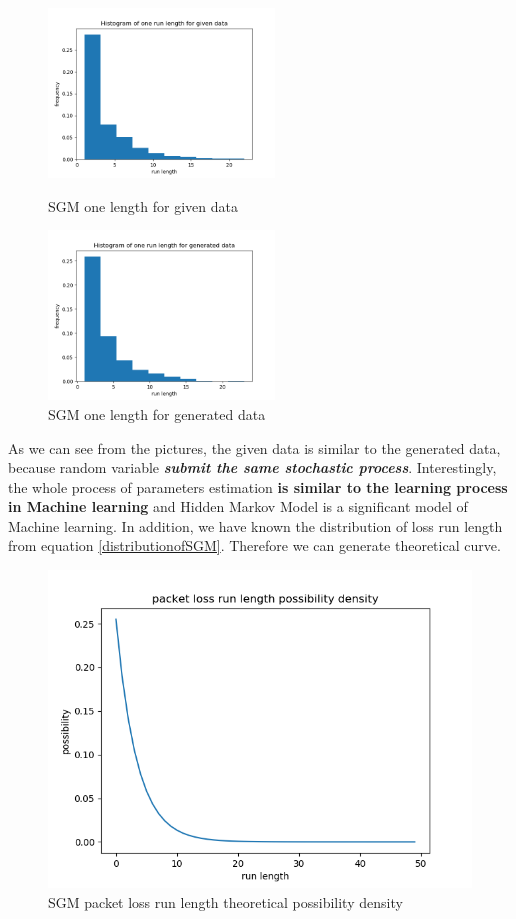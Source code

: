 \documentclass[11pt]{article}
\begin{document}
\begin{figure}[htbp]
    \centering
    \begin{minipage}[t]{0.48\textwidth}
    \centering
    \includegraphics[width=6cm]{Histogram_of_one_run_length_for_given_data.png}
    \caption{SGM one length for given data}
    \end{minipage}
    \begin{minipage}[t]{0.48\textwidth}
    \centering
    \includegraphics[width=6cm]{Histogram_of_one_run_length_for_generated_data.png}
    \caption{SGM one length for generated data}
    \end{minipage}
\end{figure}
As we can see from the pictures, the given data is similar to the generated data, because random variable \textbf{\emph{submit the same stochastic process}}. 
Interestingly, the whole process of parameters estimation \textbf{is similar to the learning process in Machine learning} and Hidden Markov Model is a significant model of Machine learning.
In addition, we have known the distribution of loss run length from equation \ref{distributionofSGM}. 
Therefore we can generate theoretical curve. 
\begin{figure}[htb]
    \centering
    \includegraphics[scale = 0.6]{packet_loss_run_length_possibility_density.png}
    \caption{SGM packet loss run length theoretical possibility density}
    \label{SGMTD}
\end{figure}
\end{document}

